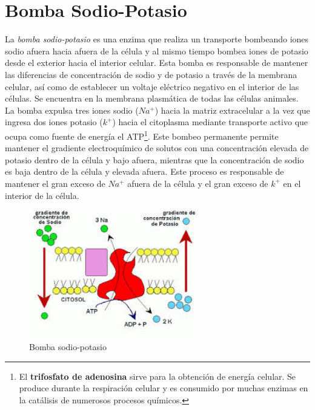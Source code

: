 \section{Bomba Sodio-Potasio}\label{sec:bomba_sodio_potasio}
La \textit{bomba sodio-potasio} es una enzima que realiza un transporte bombeando iones sodio afuera hacia afuera de la célula y al mismo tiempo bombea iones de potasio desde el exterior hacia el interior celular. Esta bomba es responsable de mantener las diferencias de concentración de sodio y de potasio a través de la membrana celular, así como de establecer un voltaje eléctrico negativo en el interior de las células. Se encuentra en la membrana plasmática de todas las células animales.\\
La bomba expulsa tres iones sodio ($Na^+$) hacia la matriz extracelular a la vez que ingresa dos iones potasio ($k^+$) hacia el citoplasma mediante transporte activo que ocupa como fuente de energía el ATP\footnote{\footnotesize El \textbf{trifosfato de adenosina} sirve para la obtención de energía celular. Se produce durante la respiración celular y es consumido por muchas enzimas en la catálisis de numerosos procesos químicos.}. Este bombeo permanente permite mantener el gradiente electroquímico de solutos con una concentración elevada de potasio dentro de la célula y bajo afuera, mientras que la concentración de sodio es baja dentro de la célula y elevada afuera. Este proceso es responsable de mantener el gran exceso de $Na^+$ afuera de la célula y el gran exceso de $k^+$ en el interior de la célula.
\begin{figure}[htbp!]
    \centering
    \includegraphics[width=7.5cm]{figures/bomba_sodio.jpeg}
    \caption{Bomba sodio-potasio}
    \label{fig:bomba_sodio_potasio}
\end{figure}
